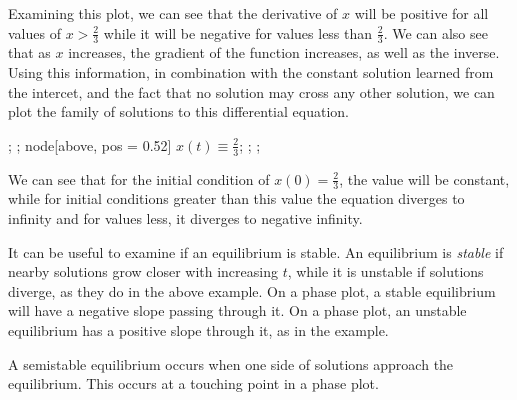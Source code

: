 \documentclass[12pt]{report}
\begin{document}
\begin{flushleft}
Examining this plot, we can see that the derivative of \(x\) will be
positive for all values of \(x > \frac{2}{3}\) while it will be negative
for values less than \(\frac{2}{3}\). We can also see that as \(x\) increases,
the gradient of the function increases, as well as the inverse. Using this
information, in combination with the constant solution learned from the
intercet, and the fact that no solution may cross any other solution,
we can plot the family of solutions to this differential equation.

\begin{plot}[
    xmin = -1,
    xmax = 0.5,
    ymin = -0.5,
    ymax = 2
]
    ;
    ;
    node[above, pos = 0.52] {\(x(t)\equiv\frac{2}{3}\)};
    ;
    ;
\end{plot}

We can see that for the initial condition of \(x(0) = \frac{2}{3}\), the value
will be constant, while for initial conditions greater than this value the
equation diverges to infinity and for values less, it diverges to negative
infinity. \par
It can be useful to examine if an equilibrium is stable. An equilibrium is
\textit{stable} if nearby solutions grow closer with increasing \(t\), while
it is unstable if solutions diverge, as they do in the above example. On a
phase plot, a stable equilibrium will have a negative slope passing through it.
On a phase plot, an unstable equilibrium has a positive slope through it,
as in the example. \par
A semistable equilibrium occurs when one side of solutions approach the
equilibrium. This occurs at a touching point in a phase plot.

\end{flushleft}
\end{document}
